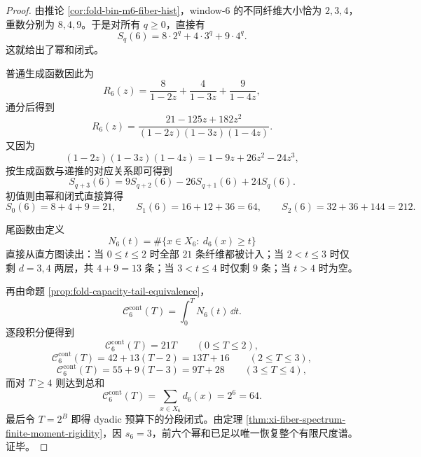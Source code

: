\begin{proof}
由推论 \ref{cor:fold-bin-m6-fiber-hist}，window-\(6\) 的不同纤维大小恰为 \(2,3,4\)，重数分别为 \(8,4,9\)。于是对所有 \(q\ge 0\)，直接有
\[
S_q(6)=8\cdot 2^q+4\cdot 3^q+9\cdot 4^q.
\]
这就给出了幂和闭式。
\par
普通生成函数因此为
\[
R_6(z)=\frac{8}{1-2z}+\frac{4}{1-3z}+\frac{9}{1-4z},
\]
通分后得到
\[
R_6(z)=\frac{21-125z+182z^2}{(1-2z)(1-3z)(1-4z)}.
\]
又因为
\[
(1-2z)(1-3z)(1-4z)=1-9z+26z^2-24z^3,
\]
按生成函数与递推的对应关系即可得到
\[
S_{q+3}(6)=9S_{q+2}(6)-26S_{q+1}(6)+24S_q(6).
\]
初值则由幂和闭式直接算得
\[
S_0(6)=8+4+9=21,\qquad
S_1(6)=16+12+36=64,\qquad
S_2(6)=32+36+144=212.
\]
\par
尾函数由定义
\[
N_6(t)=\#\{x\in X_6:\ d_6(x)\ge t\}
\]
直接从直方图读出：当 \(0\le t\le 2\) 时全部 \(21\) 条纤维都被计入；当 \(2<t\le 3\) 时仅剩 \(d=3,4\) 两层，共 \(4+9=13\) 条；当 \(3<t\le 4\) 时仅剩 \(9\) 条；当 \(t>4\) 时为空。
\par
再由命题 \ref{prop:fold-capacity-tail-equivalence}，
\[
\mathcal C_6^{\mathrm{cont}}(T)=\int_0^T N_6(t)\,\dd t.
\]
逐段积分便得到
\[
\mathcal C_6^{\mathrm{cont}}(T)=21T
\qquad(0\le T\le 2),
\]
\[
\mathcal C_6^{\mathrm{cont}}(T)=42+13(T-2)=13T+16
\qquad(2\le T\le 3),
\]
\[
\mathcal C_6^{\mathrm{cont}}(T)=55+9(T-3)=9T+28
\qquad(3\le T\le 4),
\]
而对 \(T\ge 4\) 则达到总和
\[
\mathcal C_6^{\mathrm{cont}}(T)=\sum_{x\in X_6}d_6(x)=2^6=64.
\]
最后令 \(T=2^B\) 即得 dyadic 预算下的分段闭式。由定理 \ref{thm:xi-fiber-spectrum-finite-moment-rigidity}，因 \(s_6=3\)，前六个幂和已足以唯一恢复整个有限尺度谱。证毕。
\end{proof}

